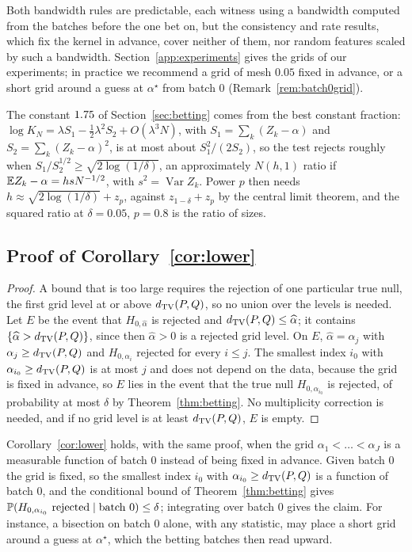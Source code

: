 Both bandwidth rules are predictable, each witness using a bandwidth computed from the batches before the one bet on,
but the consistency and rate results, which fix the kernel in advance, cover neither of them, nor random features
scaled by such a bandwidth. Section~\ref{app:experiments} gives the grids of our experiments; in practice we
recommend a grid of mesh $0.05$ fixed in advance, or a short grid around a guess at $\alpha^\star$ from batch $0$
(Remark~\ref{rem:batch0grid}).

The constant $1.75$ of Section~\ref{sec:betting} comes from the best constant fraction: $\log
K_N=\lambda S_1-\tfrac12\lambda^2S_2+O(\lambda^3N)$, with $S_1=\sum_k(Z_k-\alpha)$ and $S_2=\sum_k(Z_k-\alpha)^2$, is at
most about $S_1^2/(2S_2)$, so the test rejects roughly when $S_1/S_2^{1/2}\ge\sqrt{2\log(1/\delta)}$, an approximately
$N(h,1)$ ratio if $\mathbb{E} Z_k-\alpha=hsN^{-1/2}$, with $s^2=\operatorname{Var}Z_k$. Power $p$ then needs $h\approx\sqrt{2\log(1/\delta)}+z_p$, against
$z_{1-\delta}+z_p$ by the central limit theorem, and the squared ratio at $\delta=0.05$, $p=0.8$ is the ratio of sizes.

\subsection{Proof of Corollary~\ref{cor:lower}}

\begin{proof}
A bound that is too large requires the rejection of one particular true null, the first grid level at or
above $d_{\mathrm{TV}}(P,Q)$, so no union over the levels is needed. Let $E$ be the event that $H_{0,\widehat\alpha}$ is rejected and $d_{\mathrm{TV}}(P,Q)\le\widehat\alpha$; it
contains $\{\widehat\alpha>d_{\mathrm{TV}}(P,Q)\}$, since then $\widehat\alpha>0$ is a rejected grid level. On
$E$, $\widehat\alpha=\alpha_j$ with $\alpha_j\ge d_{\mathrm{TV}}(P,Q)$ and $H_{0,\alpha_i}$ rejected for every $i\le j$. The
smallest index $i_0$ with $\alpha_{i_0}\ge d_{\mathrm{TV}}(P,Q)$ is at most $j$ and does not depend on the data, because the grid is
fixed in advance, so $E$ lies in the event that the true null $H_{0,\alpha_{i_0}}$ is rejected, of probability at most
$\delta$ by Theorem~\ref{thm:betting}. No multiplicity correction is needed, and if no grid level is at least
$d_{\mathrm{TV}}(P,Q)$, $E$ is empty.
\end{proof}

\begin{remark}
\label{rem:batch0grid}
Corollary~\ref{cor:lower} holds, with the same proof, when the grid $\alpha_1<\dots<\alpha_J$ is a measurable function
of batch $0$ instead of being fixed in advance. Given batch $0$ the grid is fixed, so the smallest index $i_0$ with
$\alpha_{i_0}\ge d_{\mathrm{TV}}(P,Q)$ is a function of batch $0$, and the conditional bound of Theorem~\ref{thm:betting} gives
$\mathbb{P}(H_{0,\alpha_{i_0}}\text{ rejected}\mid\text{batch }0)\le\delta$; integrating over batch $0$ gives the claim. For
instance, a bisection on batch $0$ alone, with any statistic, may place a short grid around a guess at $\alpha^\star$,
which the betting batches then read upward.
\end{remark}


